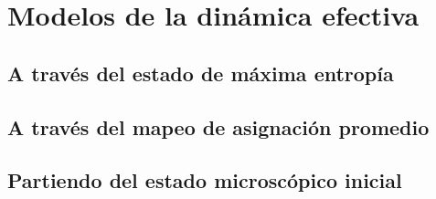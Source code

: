 \chapter{Modelos de la dinámica efectiva}


\section{A través del estado de máxima entropía}
\section{A través del mapeo de asignación promedio}
\section{Partiendo del estado microscópico inicial}

